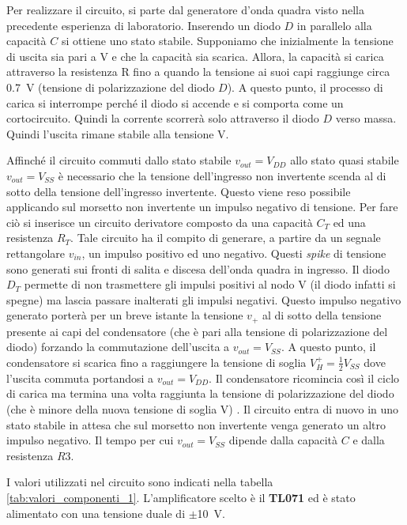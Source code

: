 Per realizzare il circuito, si parte dal generatore d'onda quadra visto nella precedente esperienza di laboratorio. Inserendo un diodo $D$ in parallelo alla capacità $C$ si ottiene uno stato stabile. Supponiamo che inizialmente la tensione di uscita sia pari a V e che la capacità sia scarica. Allora, la capacità si carica attraverso la resistenza R fino a quando la tensione ai suoi capi raggiunge circa \SI{0.7}{\volt} (tensione di polarizzazione del diodo $D$). A questo punto, il processo di carica si interrompe perché il diodo si accende e si comporta come un cortocircuito. Quindi la corrente scorrerà solo attraverso il diodo $D$ verso massa. Quindi l'uscita rimane stabile alla tensione V.

\noindent
Affinché il circuito commuti dallo stato stabile $v_{out}=V_{DD}$ allo stato quasi stabile $v_{out}=V_{SS}$ è necessario che la tensione dell'ingresso non invertente scenda al di sotto della tensione dell'ingresso invertente. Questo viene reso possibile applicando sul morsetto non invertente un impulso negativo di tensione. Per fare ciò si inserisce un circuito derivatore composto da una capacità $C_T$ ed una resistenza $R_T$. Tale circuito ha il compito di generare, a partire da un segnale rettangolare $v_{in}$, un impulso positivo ed uno negativo. Questi \textit{spike} di tensione sono generati sui fronti di salita e discesa dell'onda quadra in ingresso. Il diodo $D_T$ permette di non trasmettere gli impulsi positivi al nodo V\super{+} (il diodo infatti si spegne) ma lascia passare inalterati gli impulsi negativi.
Questo impulso negativo generato porterà per un breve istante la tensione $v_+$ al di sotto della tensione presente ai capi del condensatore (che è pari alla tensione di polarizzazione del diodo) forzando la commutazione dell'uscita a $v_{out}=V_{SS}$. A questo punto, il condensatore si scarica fino a raggiungere la tensione di soglia $V_H^+=\frac{1}{2}V_{SS}$ dove l'uscita commuta portandosi a $v_{out}=V_{DD}$. Il condensatore ricomincia così il ciclo di carica ma termina una volta raggiunta la tensione di polarizzazione del diodo (che è minore della nuova tensione di soglia V\super{+}) . Il circuito entra di nuovo in uno stato stabile in attesa che sul morsetto non invertente venga generato un altro impulso negativo. Il tempo per cui $v_{out}=V_{SS}$ dipende dalla capacità $C$ e dalla resistenza $R3$.

\noindent
I valori utilizzati nel circuito sono indicati nella tabella \ref{tab:valori_componenti_1}. L'amplificatore scelto è il \textbf{TL071} ed è stato alimentato con una tensione duale di $\pm$\SI{10}{\volt}.

